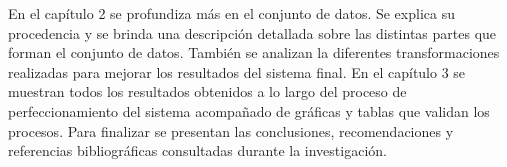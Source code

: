 En el capítulo 2 se profundiza más en el conjunto de datos. Se explica su procedencia y se brinda una descripción detallada sobre las distintas partes que forman el conjunto de datos. También se analizan la diferentes transformaciones realizadas para mejorar los resultados del sistema final. En el capítulo 3 se muestran todos los resultados obtenidos a lo largo del proceso de perfeccionamiento del sistema acompañado de gráficas y tablas que validan los procesos. Para finalizar se presentan las conclusiones, recomendaciones y referencias bibliográficas consultadas durante la investigación.





